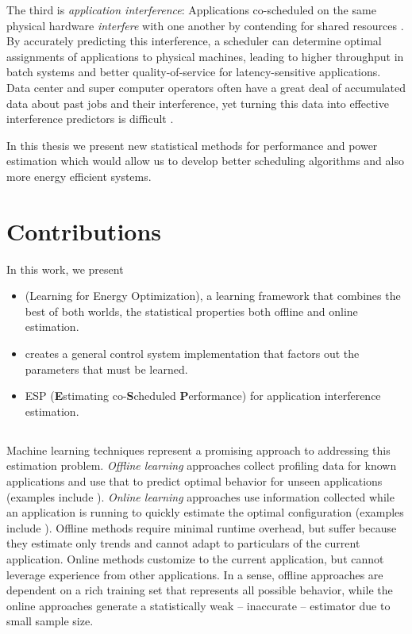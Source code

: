 The third is \emph{application interference}: Applications co-scheduled on the
same physical hardware \emph{interfere} with one another by contending for shared
resources \cite{dwyer2012practical,kambadur2012measuring,Bubble-flux,merkel2010resource}.
By accurately predicting this interference, a scheduler
can determine optimal assignments of applications to physical
machines, leading to higher throughput in batch systems and better
quality-of-service for latency-sensitive applications. Data center and super
computer operators often have a great deal of
accumulated data about past jobs and their interference, yet turning
this data into effective interference predictors is difficult
\cite{kambadur2012measuring}.

In this thesis we present new statistical methods for performance and power
estimation which would allow us to develop better scheduling algorithms and also
more energy efficient systems.






\section{Contributions}
In this work, we present

\begin{itemize}
  \item \SYSTEMLEO{} (Learning for Energy
  Optimization), a learning framework that combines the best of both
  worlds, \ie the statistical properties both offline and online
  estimation.
 \item \SYSTEM{} creates a general control system implementation that factors
 out the parameters that must be learned.
 \item ESP (\textbf{E}stimating co-\textbf{S}cheduled \textbf{P}erformance) for
 application interference estimation.
\end{itemize}

\subsection{\SYSTEMLEO{}}

Machine learning techniques represent a promising approach to
addressing this estimation problem.  \emph{Offline learning}
approaches collect profiling data for known applications and use that
to predict optimal behavior for unseen applications (examples include
\cite{Yi2003,Koala,LeeBrooks2006,CPR,ChenJohn2011}).  \emph{Online
 learning} approaches use information collected while an application
is running to quickly estimate the optimal configuration (examples
include
\cite{Li2006,Flicker,ParallelismDial,Ponamarev,petabricksDynamic,LeeBrooks,TAAS}).
Offline methods require minimal runtime overhead, but suffer because
they estimate only trends and cannot adapt to particulars of the
current application.  Online methods customize to the current
application, but cannot leverage experience from other applications.
In a sense, offline approaches are dependent on a rich training set
that represents all possible behavior, while the online approaches
generate a statistically weak -- \ie inaccurate -- estimator due to
small sample size.

